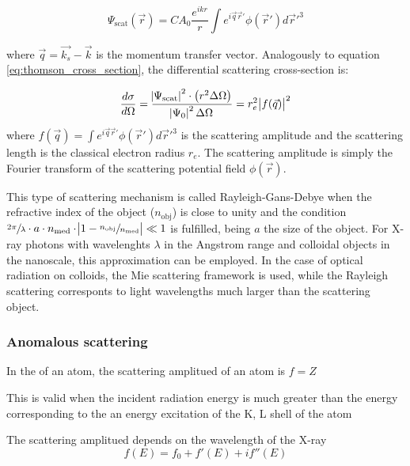 \begin{equation}
       \Psi_{\text{scat}}\left( \vec{r} \right)=C A_0 \frac{e^{i k r}}{r} \int e^{ i \vec{q}\vec{r}' }  \phi(\vec{r}')  d\vec{r}'^3
\end{equation}

where $\vec{q}=\vec{k_s} - \vec{k}$ is the momentum transfer vector. Analogously to equation \ref{eq:thomson_cross_section}, the differential scattering cross-section is:

\begin{equation}
        \label{eq:rayleigh_cross_section}
        \frac{d\sigma}{d\Omega}= \frac{\abs{\Psi_{\text{scat}}}^2 \cdot \left(r^2 \Delta \Omega \right)}{\abs{\Psi_{0}}^2\Delta \Omega}=r_e^2 \abs{f(\vec{q})}^2
\end{equation}
where $f(\vec{q})=\int e^{ i \vec{q}\vec{r}' }  \phi(\vec{r}')  d\vec{r}'^3$ is the scattering amplitude and the scattering length is the classical electron radius $r_e$. The scattering amplitude is simply the Fourier transform of the scattering potential field $\phi(\vec{r})$. 

This type of scattering mechanism is called Rayleigh-Gans-Debye when the refractive index of the object ($n_{\text{obj}}$) is close to unity and the condition $\sfrac{2\pi}{\lambda} \cdot a \cdot n_{\text{med}} \cdot \abs{1-\sfrac{n_{\text{obj}}}{n_{\text{med}}}}\ll1$ is fulfilled, being $a$ the size of the object. For X-ray photons with wavelenghts $\lambda$ in the Angstrom range and colloidal objects in the nanoscale, this approximation can be employed. In the case of optical radiation on colloids, the Mie scattering framework is used, while the Rayleigh scattering corresponts to light wavelengths much larger than the scattering object.

\subsubsection{Anomalous scattering}

In the of an atom, the scattering amplitued of an atom is $f=Z$

This is valid when the incident radiation energy is much greater than the energy corresponding to the an energy excitation of the K, L shell of the atom

The scattering amplitued depends on the wavelength of the X-ray
\begin{equation}
        f(E) = f_0 + f'(E) + i f'' (E)
\end{equation}

